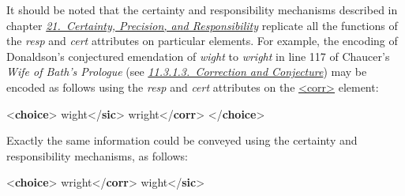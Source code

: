 It should be noted that the certainty and responsibility mechanisms described in chapter \textit{\hyperref[CE]{21.\ Certainty, Precision, and Responsibility}} replicate all the functions of the {\itshape resp} and {\itshape cert} attributes on particular elements. For example, the encoding of Donaldson's conjectured emendation of \textit{wight} to \textit{wright} in line 117 of Chaucer's \textit{Wife of Bath's Prologue} (see \textit{\hyperref[PHCC]{11.3.1.3.\ Correction and Conjecture}}) may be encoded as follows using the {\itshape resp} and {\itshape cert} attributes on the \hyperref[TEI.corr]{<corr>} element: \par\bgroup{}\exampleFont \begin{shaded}\noindent\mbox{}{<\textbf{choice}>}\mbox{}\newline 
{}wight{</\textbf{sic}>}\mbox{}\newline 
{}wright{</\textbf{corr}>}\mbox{}\newline 
{</\textbf{choice}>}\end{shaded}\egroup\par \noindent  Exactly the same information could be conveyed using the certainty and responsibility mechanisms, as follows: \par\bgroup{}\exampleFont \begin{shaded}\noindent\mbox{}{<\textbf{choice}>}\mbox{}\newline 
{}wright{</\textbf{corr}>}\mbox{}\newline 
{}wight{</\textbf{sic}>}\mbox{}\newline 

\end{shaded}
